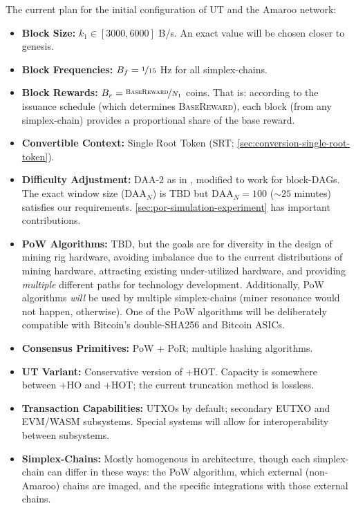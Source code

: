 The current plan for the initial configuration of UT and the Amaroo network:

\begin{itemize}
    \item \textbf{Block Size:} $k_1 \in [3000, 6000]$ B/s.
    An exact value will be chosen closer to genesis.
    \item \textbf{Block Frequencies:} $B_f = \nicefrac{1}{15}$ Hz for all simplex-chains.
    \item \textbf{Block Rewards:} $B_r = \nicefrac{\textsc{BaseReward}}{N_1}$ coins.
    That is: according to the issuance schedule (which determines \textsc{BaseReward}), each block (from any simplex-chain) provides a proportional share of the base reward.
    \item \textbf{Convertible Context:} Single Root Token (SRT; \autoref{sec:conversion-single-root-token}).
    \item \textbf{Difficulty Adjustment:} \textsc{DAA-2} as in \citeDaaTwoLink{}, modified to work for block-DAGs.
    The exact window size ($\text{DAA}_N$) is TBD but $\text{DAA}_N = 100$ ($\sim 25$ minutes) satisfies our requirements.
    \autoref{sec:por-simulation-experiment} has important contributions.
    \item \textbf{PoW Algorithms:} TBD, but the goals are for diversity in the design of mining rig hardware, avoiding imbalance due to the current distributions of mining hardware, attracting existing under-utilized hardware, and providing \emph{multiple} different paths for technology development.
    Additionally, PoW algorithms \emph{will} be used by multiple simplex-chains (miner resonance would not happen, otherwise).
    One of the PoW algorithms will be deliberately compatible with Bitcoin's double-SHA256 and Bitcoin ASICs.
    \item \textbf{ Consensus Primitives:} PoW + PoR; multiple hashing algorithms.
    \item \textbf{UT Variant:} Conservative version of +HOT.
    Capacity is somewhere between +HO and +HOT; the current truncation method is lossless.
    \item \textbf{ Transaction Capabilities:} UTXOs by default; secondary EUTXO and EVM/WASM subsystems.
    Special systems will allow for interoperability between subsystems.
    \item \textbf{Simplex-Chains:} Mostly homogenous in architecture, though each simplex-chain can differ in these ways: the PoW algorithm, which external (non-Amaroo) chains are imaged, and the specific integrations with those external chains.

\end{itemize}
